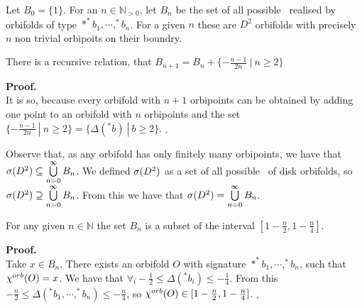 \begin{definition} 
Let $B_0 = \{1\}$.
For an $n \in \mathbb{N}_{>0}$, let $B_n$ be the set of all possible \Eoc\ realised 
by orbifolds of type 
$*^*b_1, \cdots, ^*b_n$. For a given $n$ these are 
$D^2$ orbifolds with precisely $n$ non trivial orbipoits on their boundry.
\end{definition}


\begin{observation}\label{recursive_relation}
There is a recursive relation, that $B_{n+1}=B_n+\{-\frac{n-1}{2n}\ |\ n\geq 2\}$
\end{observation}
\textbf{Proof.} \\
It is so, because every orbifold with $n+1$ orbipoints can be obtained by adding one point 
to an orbifold with $n$ orbipoints and the set 
$\{-\frac{n-1}{2n}\ |\ n\geq 2\} = \{\Delta(^\ast b)\ |\ b \geq 2\}$. $_\square$


\begin{observation}\label{form_of_a_spectrum}
Observe that, as any orbifold has only finitely many orbipoints, we have that ${{\sigma}(D^2)} \subseteq 
\bigcup\limits^\infty_{n=0}B_n $. We defined ${{\sigma}(D^2)}$ as a set of all possible \Eoc\ of disk 
orbifolds, so ${{\sigma}(D^2)} \supseteq 
\bigcup\limits^\infty_{n=0}B_n $. From this we have that ${{\sigma}(D^2)} = \bigcup\limits^\infty_{n=0}B_n$.
\end{observation}

\begin{lemma}\label{fixed_number_of_orbipoints}
For any given $n \in \mathbb{N}$ the set $B_n$ is a subset of the interval 
$[1-\frac{n}{2}, 1-\frac{n}{4}]$.
\end{lemma}
\textbf{Proof.} \\
Take $x \in B_n$. There exists an orbifold $O$ with signature $\ast ^*b_1, \cdots, ^*b_n$, 
such that ${\chi^{orb}(O)} = x$. We have that $\forall_i -\frac{1}{2} \leq \Delta(^*b_i) \leq 
-\frac{1}{4}$. From this $-\frac{n}{2} \leq \Delta(^*b_1, \cdots, ^*b_n) \leq -\frac{n}{4}$, 
so ${\chi^{orb}(O)} \in [1-\frac{n}{2}, 1-\frac{n}{4}]$. $_\square$

